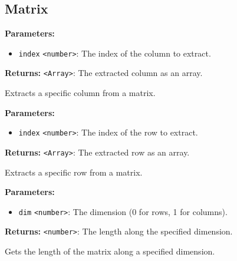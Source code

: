\documentclass[12pt,a4paper]{article}
\begin{document}
\subsection{Matrix}
\vspace{5mm}
\noindent {}


\noindent \textbf{Parameters:}
\begin{itemize}
  \item \texttt{index} \texttt{<number>}: The index of the column to extract.
\end{itemize}

\noindent \textbf{Returns:} \texttt{<Array>}: The extracted column as an array.

\noindent Extracts a specific column from a matrix.

\vspace{5mm}
\noindent {}


\noindent \textbf{Parameters:}
\begin{itemize}
  \item \texttt{index} \texttt{<number>}: The index of the row to extract.
\end{itemize}

\noindent \textbf{Returns:} \texttt{<Array>}: The extracted row as an array.

\noindent Extracts a specific row from a matrix.

\vspace{5mm}
\noindent {}


\noindent \textbf{Parameters:}
\begin{itemize}
  \item \texttt{dim} \texttt{<number>}: The dimension (0 for rows, 1 for columns).
\end{itemize}

\noindent \textbf{Returns:} \texttt{<number>}: The length along the specified dimension.

\noindent Gets the length of the matrix along a specified dimension.

\vspace{5mm}
\noindent {}
\end{document}
